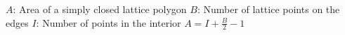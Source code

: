 $A$: Area of a simply closed lattice polygon \newline
$B$: Number of lattice points on the edges \newline
$I$: Number of points in the interior \newline
$A = I + \frac{B}{2} - 1$
